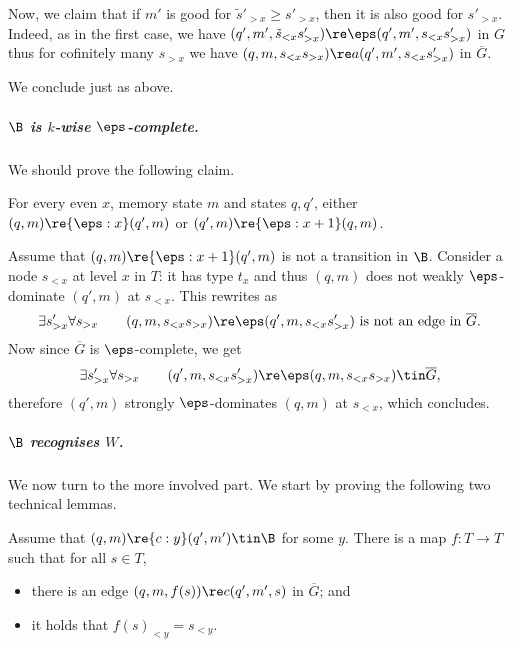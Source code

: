 \begin{claimproof}
\begin{itemize}
    Now, we claim that if $m'$ is good for $\tilde s'_{> x} \geq s'_{> x}$, then it is also good for $s'_{> x}$.
    Indeed, as in the first case, we have $(q',m',\tilde s_{<x}s'_{> x}) \re \eps (q',m',s_{<x}s'_{> x})$ in $G$ thus for cofinitely many $s_{> x}$ we have $(q,m,s_{< x}s_{>x}) \re a (q',m',s_{<x} s'_{> x})$ in $\overline{G}$.

    We conclude just as above. \claimqedhere 
\end{itemize}
\end{claimproof}


\subparagraph*{$\B$ is $k$-wise $\eps$-complete.}

We should prove the following claim.

\begin{claim}
    For every even $x$, memory state $m$ and states $q,q'$, either $(q,m) \re{\eps:x} (q',m)$ or $(q',m) \re{\eps:x+1} (q,m)$.
\end{claim}

\begin{claimproof}
    Assume that $(q,m) \re{\eps:x+1} (q',m)$ is not a transition in $\B$.
    Consider a node $s_{<x}$ at level $x$ in $T$: it has type $t_x$ and thus $(q,m)$ does not weakly $\eps$-dominate $(q',m)$ at $s_{<x}$.
    This rewrites as
    \[
        \exists s'_{> x} \forall s_{> x} \qquad (q,m,s_{< x} s_{>x}) \re \eps (q',m,s_{< x} s'_{>x}) \text{ is not an edge in } \overline G.
    \]
    Now since $\overline G$ is $\eps$-complete, we get 
    \[
        \exists s'_{> x} \forall s_{> x} \qquad (q',m,s_{< x} s'_{>x}) \re \eps (q,m,s_{< x} s_{>x}) \tin \overline G,
    \]
    therefore $(q',m)$ strongly $\eps$-dominates $(q,m)$ at $s_{<x}$, which concludes.
\end{claimproof}


\subparagraph*{$\B$ recognises $W$.}

We now turn to the more involved part.
We start by proving the following two technical lemmas.

\begin{lemma}\label{lem:technical1}
Assume that $(q,m) \re{c:y} (q',m') \tin \B$ for some $y$.
There is a map $f:T \to T$ such that for all $s \in T$, 
\begin{itemize}
    \item there is an edge $(q,m,f(s)) \re c (q',m',s)$ in $\overline G$; and
    \item it holds that $f(s)_{< y} = s_{< y}$.
\end{itemize}
\end{lemma}

